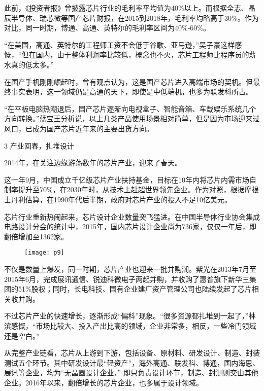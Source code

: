 \documentclass[utf8]{book}
\begin{document}
	此前，《投资者报》曾披露芯片行业的毛利率平均值为40\%以上。而根据全志、晶辰半导体、瑞芯微等国产芯片财报，在2015到2018年，毛利率均略高于30\%。作为对比，同一时期，博通、高通、英特尔的毛利率区间为40\%-60\%。
	
	“在美国，高通、英特尔的工程师工资不会低于谷歌、亚马逊，”吴子豪这样感慨，“但在国内，由于整体利润率比较低，概念也不火，芯片工程师比程序员的薪水真的低太多。”
	
	在国产手机刚刚崛起时，曾有观点认为，这是国产芯片进入高端市场的契机。但最终事实表明，这一领域仍是高通的天下，即使是中低端机，也多为联发科所占。
	
	“在平板电脑热潮退后，国产芯片逐渐向电视盒子、智能音箱、车载娱乐系统几个方向转换。”蓝宝王分析说，以上几类产品使用场景相对简单，但是因为市场迎来过风口，已成为国产芯片近年来的主要出货方向。
	
	
	\begin{flushleft}
		{\Large 3 产业回春，扎堆设计}
	\end{flushleft}
	
	2014年，在关注边缘游荡数年的芯片产业，迎来了春天。
	
	这一年9月，中国成立千亿级芯片产业扶持基金，目标在10年内将芯片内需市场自制率提升至70\%，在2030年时，从技术上赶超世界领先企业。作为对照，根据摩根士丹利估算，在1990年代后半期，政府对芯片产业的投入不足10亿美元。
	
	芯片行业重新热闹起来，芯片设计企业数量突飞猛进。在中国半导体行业协会集成电路设计分会的统计中，2015年，国内芯片设计企业尚为736家，仅仅一年后，即翻倍增加至1362家。
	
		\begin{figure}[H]
		\centering
		\texttt{[image: p9]}
		\end{figure}
	
	不仅是数量上爆发，同一时期，芯片产业也迎来一批并购潮。紫光在2013年7月至2015年6月，完成展讯通信、锐迪科微电子两起并购，并收购了惠普旗下新华三集团的51\%股权；同时，长电科技、国有企业建广资产管理公司也陆续发起了芯片相关收并购。
	
	不过芯片产业的快速增长，逐渐形成“偏科”现象。“很多资源都扎堆到一起了，”林滨感慨，“市场比较大、投入产出比高的领域，企业非常多，相反，一些冷门领域还是空白。”
	
	从完整产业链看，芯片从上游到下游，包括设备、原材料、研发设计、制造、封装测试五个环节。其中研发设计最“轻资产”，海外高通、联发科、博通，国内海思、展讯等企业，均为“无晶圆设计企业，” 即只负责设计环节，制造、封测则交由其他企业。2016年以来，翻倍增长的芯片企业，也多属于设计领域。
	
\end{document}
